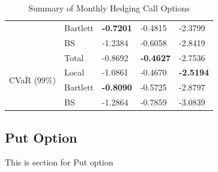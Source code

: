 \documentclass[letterpaper,12pt,titlepage,oneside,final]{book}
\numberwithin{equation}{section}
\theoremstyle{definition}
\begin{document}
\begin{table}[htp!]
\begin{tabular}{ll|l|l|l|}
    \multicolumn{1}{|l|}{}                                & Bartlett & \textbf{-0.7201} & -0.4815          & -2.3799          \\  
    \multicolumn{1}{|l|}{}                                & BS       & -1.2384          & -0.6058          & -2.8419          \\ \hline
    \multicolumn{1}{|l|}{\multirow{4}{*}{CVaR (99\%)}}    & Total    & -0.8692          & \textbf{-0.4627} & -2.7536          \\  
    \multicolumn{1}{|l|}{}                                & Local    & -1.0861          & -0.4670          & \textbf{-2.5194} \\  
    \multicolumn{1}{|l|}{}                                & Bartlett & \textbf{-0.8090}  & -0.5725          & -2.8797          \\  
    \multicolumn{1}{|l|}{}                                & BS       & -1.2864          & -0.7859          & -3.0839          \\ \hline
    \end{tabular}
	\caption{Summary of Monthly Hedging Call Options} \label{table:CallTotalM}
    \end{table}



\subsection{Put Option}
This is section for Put option
\end{document}
